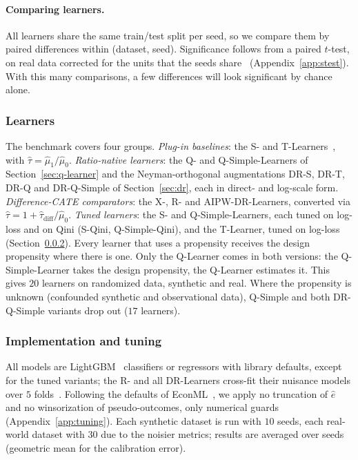 \documentclass{article}
\begin{document}
\paragraph{Comparing learners.}
All learners share the same train/test split per seed, so we compare them by
paired differences within (dataset, seed). Significance follows from a paired
$t$-test, on real data corrected for the units that the seeds
share~\citep{nadeau2003inference} (Appendix~\ref{app:stest}). With this
many comparisons, a few differences will look significant by chance
alone.

\subsubsection{Learners}
\label{sec:learners-v2}
The benchmark covers four groups. \emph{Plug-in baselines}: the S- and
T-Learners~\citep{kunzel2019metalearners}, with
$\hat\tau = \hat\mu_1/\hat\mu_0$. \emph{Ratio-native learners}: the Q- and
Q-Simple-Learners of Section~\ref{sec:q-learner} and the Neyman-orthogonal
augmentations DR-S, DR-T, DR-Q and DR-Q-Simple of Section~\ref{sec:dr}, each
in direct- and log-scale form. \emph{Difference-CATE comparators}: the X-,
R- and AIPW-DR-Learners, converted via
$\hat\tau = 1 + \hat\tau_{\text{diff}}/\hat\mu_0$. \emph{Tuned learners}: the
S- and Q-Simple-Learners, each tuned on log-loss and on Qini (S-Qini,
Q-Simple-Qini), and the T-Learner, tuned on log-loss
(Section~\ref{sec:tuning-setup-v2}). Every learner that uses a propensity
receives the design propensity where there is one. Only the Q-Learner comes in
both versions: the Q-Simple-Learner takes the design propensity, the Q-Learner
estimates it. This gives $20$ learners on randomized data, synthetic and real.
Where the propensity is unknown (confounded synthetic and observational data),
Q-Simple and both DR-Q-Simple variants drop out ($17$ learners).

\subsubsection{Implementation and tuning}
\label{sec:tuning-setup-v2}
All models are LightGBM~\citep{lightgbm} classifiers or regressors with
library defaults, except for the tuned variants; the R- and all DR-Learners
cross-fit their nuisance models over $5$ folds~\citep{chernozhukov2018double}. Following the defaults of
EconML~\citep{econml}, we apply no truncation of $\hat e$ and no
winsorization of pseudo-outcomes, only numerical guards
(Appendix~\ref{app:tuning}). Each synthetic dataset is run with $10$ seeds,
each real-world dataset with $30$ due to the noisier metrics; results are
averaged over seeds (geometric mean for the calibration error).
\end{document}
